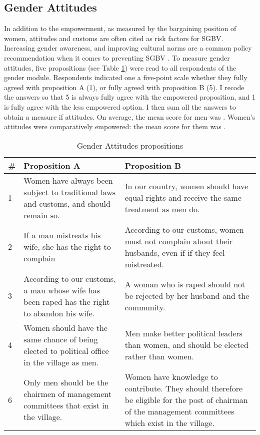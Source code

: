 \documentclass[11pt,a4paper]{scrartcl} %
\begin{document}
\subsection*{Gender Attitudes}
In addition to the empowerment, as measured by the bargaining position of women, attitudes and customs are often cited as risk factors for SGBV. Increasing gender awareness, and improving cultural norms are a common policy recommendation when it comes to preventing SGBV \cite[e.g.][]{Quattrochi2019,Bueno2017}. To measure gender attitudes, five propositions (see Table \ref{tab:genderatt}) were read to all respondents of the gender module. Respondents indicated one a five-point scale whether they fully agreed with proposition A (1), or fully agreed with proposition B (5). I recode the answers so that 5 is always fully agree with the empowered proposition, and 1 is fully agree with the less empowered option. I then sum all the answers to obtain a measure if attitudes. On average, the mean score for men was  . Women's attitudes were comparatively empowered: the mean score for them was .

\begin{table}[h]
\centering
\caption{Gender Attitudes propositions}
\label{tab:genderatt}
\begin{tabularx}{\textwidth}{l X X}
\toprule
\# & Proposition A & Proposition B \\
\hline
1 & Women have always been subject to traditional laws and customs, and should remain so. &	In our country, women should have equal rights and receive the same treatment as men do. \\
2 & If a man mistreats his wife, she has the right to complain &	According to our customs, women must not complain about their husbands, even if if they feel mistreated. \\
3 & According to our customs, a man whose wife has been raped has the right to abandon his wife. &	A woman who is raped should not be rejected by her husband and the community. \\
4 & Women should have the same chance of being elected to political office in the village as men. & 	 Men make better political leaders  than women, and should be elected rather than women. \\
6 & Only men should be the chairmen of management committees that exist in the village. &	Women have knowledge to contribute. They should therefore be eligible for the post of chairman of the management committees which exist in the village. \\
\bottomrule
\end{tabularx}
\end{table}
\end{document}
